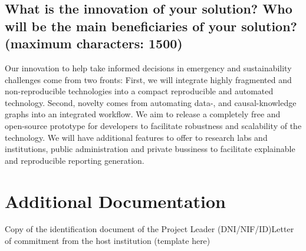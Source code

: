 \documentclass[authoryear,1p,12pt]{elsarticle}
\begin{document}
\subsection{{\bf What is the innovation of your solution? Who will be the
  main beneficiaries of your solution? (maximum characters: 1500)}}
Our innovation to help take informed decisions in emergency and
sustainability challenges come from two fronts: First, we will
integrate highly fragmented and non-reproducible technologies into a
compact reproducible and automated technology. Second, novelty comes
from automating data-, and causal-knowledge graphs into an integrated
workflow. We aim to release a completely free and open-source
prototype for developers to facilitate robustness and scalability of
the technology. We will have additional features to offer to research
labs and institutions, public administration and private bussiness to
facilitate explainable and reproducible reporting generation.

\section{{\bf Additional Documentation}}
Copy of the identification document of the Project Leader
(DNI/NIF/ID)Letter of commitment from the host institution (template
here)
\end{document}
